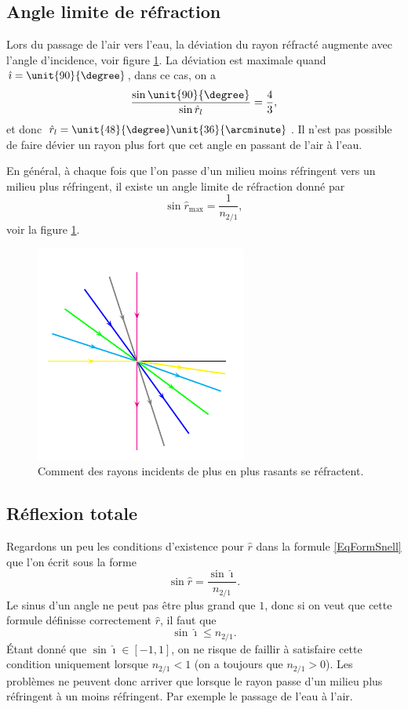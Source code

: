 \subsection{Angle limite de réfraction}

Lors du passage de l'air vers l'eau, la déviation du rayon réfracté augmente avec l'angle d'incidence, voir figure \ref{FigRasants}. La déviation est maximale quand $\hat\imath=\unit{90}{\degree}$, dans ce cas, on a 
\[ 
  \frac{ \sin\unit{90}{\degree} }{ \sin\hat r_{l} }=\frac{ 4 }{ 3 },
\]
et donc $\hat r_{l}=\unit{48}{\degree}\unit{36}{\arcminute}$. Il n'est pas possible de faire dévier un rayon plus fort que cet angle en passant de l'air à l'eau.

En général, à chaque fois que l'on passe d'un milieu moins réfringent vers un milieu plus réfringent, il existe un angle limite de réfraction donné par
\[ 
  \sin\hat r_{\text{max}}=\frac{1}{ n_{2/1} },
\]
voir la figure \ref{FigRasants}. 

\begin{figure}[ht]
\centering
\includegraphics{fig20947_1.png}
\caption{Comment des rayons incidents de plus en plus rasants se réfractent.} \label{FigRasants}
\end{figure}


\subsection{Réflexion totale}

Regardons un peu les conditions d'existence pour $\hat r$ dans la formule \eqref{EqFormSnell} que l'on écrit sous la forme
\begin{equation} \label{EqVarharrsinimath}
  \sin\hat r=\frac{ \sin\hat\imath }{ n_{2/1} }.
\end{equation}
Le sinus d'un angle ne peut pas être plus grand que $1$, donc si on veut que cette formule définisse correctement $\hat r$, il faut que 
\[
\sin\hat\imath\leq n_{2/1}.
\]
Étant donné que $\sin\hat\imath\in[-1,1]$, on ne risque de faillir à satisfaire cette condition uniquement lorsque $n_{2/1}<1$ (on a toujours que $n_{2/1}>0$). Les problèmes ne peuvent donc arriver que lorsque le rayon passe d'un milieu plus réfringent à un moins réfringent. Par exemple le passage de l'eau à l'air.

